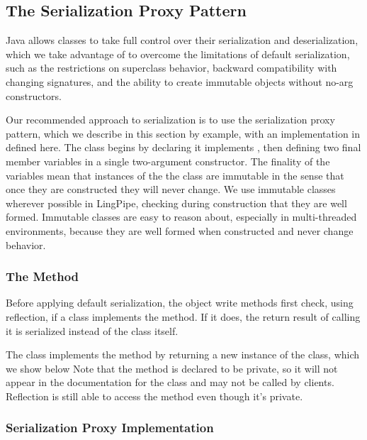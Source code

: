 \subsection{The Serialization Proxy Pattern}\label{section:io-serialization-proxy}

Java allows classes to take full control over their serialization and
deserialization, which we take advantage of to overcome the
limitations of default serialization, such as the restrictions on
superclass behavior, backward compatibility with changing signatures,
and the ability to create immutable objects without no-arg constructors.

Our recommended approach to serialization is to use the serialization
proxy pattern, which we describe in this section by example, with an
implementation in  defined here.  The class begins
by declaring it implements , then defining two
final member variables in a single two-argument constructor.
%
%
The finality of the variables mean that instances of the the class are
immutable in the sense that once they are constructed they will never
change.  We use immutable classes wherever possible in LingPipe,
checking during construction that they are well formed.  Immutable
classes are easy to reason about, especially in multi-threaded
environments, because they are well formed when constructed and never
change behavior.

\subsubsection{The  Method}

Before applying default serialization, the object write methods first
check, using reflection, if a class implements the
 method.  If it does, the return result of
calling it is serialized instead of the class itself.  

The  class implements the 
method by returning a new instance of the  class,
which we show below
%
%
Note that the method is declared to be private, so it will not appear
in the documentation for the class and may not be called by clients.
Reflection is still able to access the method even though it's
private. 

\subsubsection{Serialization Proxy Implementation}

